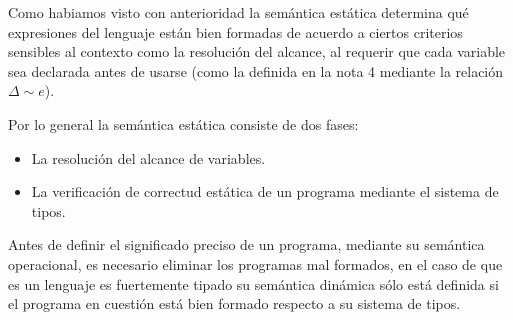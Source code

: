 \documentclass[12pt]{extarticle}
\begin{document}
Como habiamos visto con anterioridad la semántica estática determina qué expresiones del lenguaje están bien formadas de acuerdo a ciertos criterios sensibles al contexto como la resolución del alcance, al requerir que cada variable sea declarada antes de usarse (como la definida en la nota 4 mediante la relación $\Delta\sim e$).

Por lo general la semántica estática consiste de dos fases:

\begin{itemize}
\item La resolución del alcance de variables.
\item La verificación de correctud estática de un programa mediante el sistema de tipos.
\end{itemize}

Antes de definir el significado preciso de un programa, mediante su semántica operacional, es necesario eliminar los programas mal formados, en el caso de \minhs que es un lenguaje es fuertemente tipado su semántica dinámica sólo está definida si el programa en cuestión está bien formado respecto a su sistema de tipos.
\end{document}
